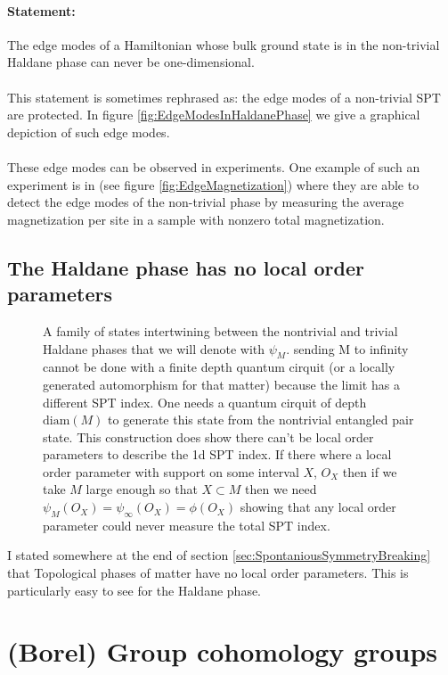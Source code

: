 \paragraph{Statement:}The edge modes of a Hamiltonian whose bulk ground state is in the non-trivial Haldane phase can never be one-dimensional.
\\\\
This statement is sometimes rephrased as: the edge modes of a non-trivial SPT are protected. In figure \ref{fig:EdgeModesInHaldanePhase} we give a graphical depiction of such edge modes.
\\\\
These edge modes can be observed in experiments. One example of such an experiment is in \cite{sompet2022realizing} (see figure \ref{fig:EdgeMagnetization}) where they are able to detect the edge modes of the non-trivial phase by measuring the average magnetization per site in a sample with nonzero total magnetization. 
\subsection{The Haldane phase has no local order parameters}\label{sec:the-haldane-phase-has-no-local-order-parameters}
\begin{figure}
	\begin{center}
		
	\end{center}
	\caption{A family of states intertwining between the nontrivial and trivial Haldane phases that we will denote with $\psi_M$. sending M to infinity cannot be done with a finite depth quantum cirquit (or a locally generated automorphism for that matter) because the limit has a different SPT index. One needs a quantum cirquit of depth $\textrm{diam}(M)$ to generate this state from the nontrivial entangled pair state. This construction does show there can't be local order parameters to describe the 1d SPT index. If there where a local order parameter with support on some interval $X$, $O_X$ then if we take $M$ large enough so that $X\subset M$ then we need $\psi_M(O_X)=\psi_{\infty}(O_X)=\phi(O_X)$ showing that any local order parameter could never measure the total SPT index.}
\end{figure}
I stated somewhere at the end of section \ref{sec:SpontaniousSymmetryBreaking} that Topological phases of matter have no local order parameters. This is particularly easy to see for the Haldane phase.
\section{(Borel) Group cohomology groups}
